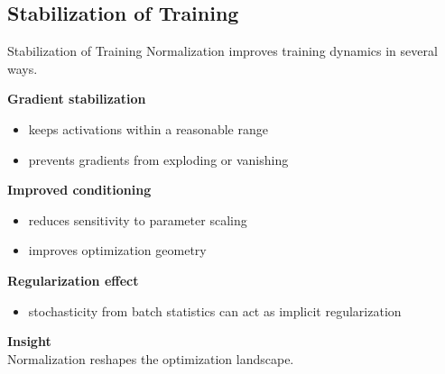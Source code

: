 \documentclass[aspectratio=169,11pt]{beamer}
\begin{document}
\subsection{Stabilization of Training}
\begin{frame}[t,allowframebreaks]{Stabilization of Training}
\small
Normalization improves training dynamics in several ways.

\textbf{Gradient stabilization}\\ \begin{itemize}
\item keeps activations within a reasonable range
\item prevents gradients from exploding or vanishing
\end{itemize}

\textbf{Improved conditioning}\\ \begin{itemize}
\item reduces sensitivity to parameter scaling
\item improves optimization geometry
\end{itemize}

\textbf{Regularization effect}\\ \begin{itemize}
\item stochasticity from batch statistics can act as implicit regularization
\end{itemize}

\textbf{Insight}\\ Normalization reshapes the optimization landscape.
\end{frame}
\end{document}
